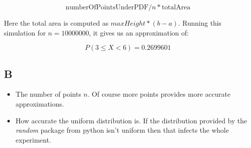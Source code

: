 \documentclass[12pt]{article}
\begin{document}
\[ \text{numberOfPointsUnderPDF} / n * \text{totalArea} \]

\noindent
Here the total area is computed as $maxHeight * (b - a)$.
Running this simulation for $n = 10000000$, it gives us an approximation of:

\[ P(3 \leq X < 6) = 0.2699601 \]

\subsection*{B}

\begin{itemize}
    \item The number of points $n$. Of course more points provides more accurate approximations.
    \item How accurate the uniform distribution is. If the distribution provided by the \textit{random} package from python isn't uniform then that infects the whole experiment.
\end{itemize}
\end{document}
